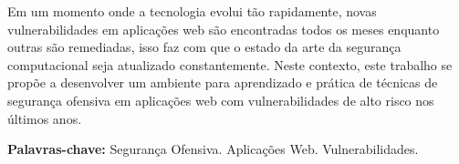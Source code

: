 \begin{resumo}[Resumo]
  Em um momento onde a tecnologia evolui tão rapidamente, novas vulnerabilidades em aplicações web são encontradas todos os meses enquanto outras são remediadas, isso faz com que o estado da arte da segurança computacional seja atualizado constantemente. Neste contexto, este trabalho se propõe a desenvolver um ambiente para aprendizado e prática de técnicas de segurança ofensiva em aplicações web com vulnerabilidades de alto risco nos últimos anos.

  \vspace{\baselineskip} 
  \textbf{Palavras-chave:} Segurança Ofensiva. Aplicações Web. Vulnerabilidades.
\end{resumo}